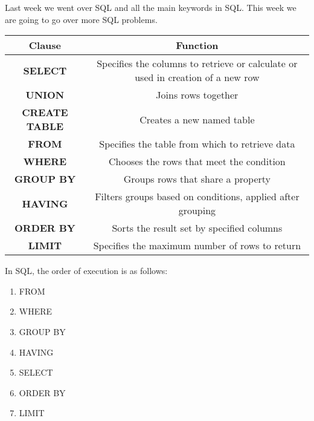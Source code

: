 Last week we went over SQL and all the main keywords in SQL. This week we are going to go over more SQL problems.

\begin{center}
    
    \begin{tabular}{|c|c|}
     \hline
     \textbf{Clause} & \textbf{Function} \\
     \hline
     \textbf{SELECT} & Specifies the columns to retrieve or calculate or used in creation of a new row \\
     \hline
     \textbf{UNION} & Joins rows together \\
     \hline
     \textbf{CREATE TABLE} & Creates a new named table \\
     \hline
     \textbf{FROM} & Specifies the table from which to retrieve data \\
     \hline
     \textbf{WHERE} & Chooses the rows that meet the condition \\
     \hline
     \textbf{GROUP BY} & Groups rows that share a property \\
     \hline
     \textbf{HAVING} & Filters groups based on conditions, applied after grouping \\
     \hline
     \textbf{ORDER BY} & Sorts the result set by specified columns \\
     \hline
     \textbf{LIMIT} & Specifies the maximum number of rows to return \\
     \hline
    \end{tabular}
\end{center}

In SQL, the order of execution is as follows:
\begin{enumerate}
    \item FROM
    \item WHERE
    \item GROUP BY
    \item HAVING
    \item SELECT
    \item ORDER BY
    \item LIMIT
\end{enumerate}